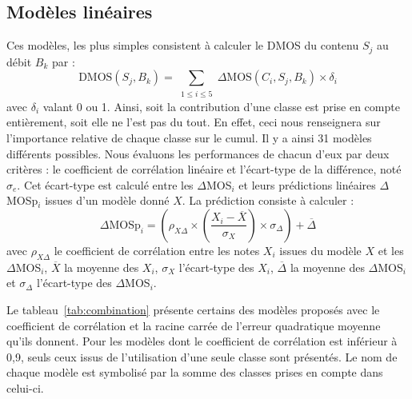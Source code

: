 \subsection{Modèles linéaires} \label{ssec:modeleLin}
Ces modèles, les plus simples consistent à calculer le DMOS du contenu $S_j$ au débit $B_k$ par :
\begin{equation}
\text{DMOS}(S_j,B_k) = \sum_{\substack{1\le i \le 5}}\Delta\text{MOS}(C_i, S_j, B_k) \times \delta_i
\end{equation}
%
avec $\delta_i$ valant 0 ou 1. Ainsi, soit la contribution d'une classe est prise en compte entièrement, soit elle ne l'est pas du tout. En effet, ceci nous renseignera sur l'importance relative de chaque classe sur le cumul. Il y a ainsi 31 modèles différents possibles. Nous évaluons les performances de chacun d'eux par deux critères : le coefficient de corrélation linéaire et l'écart-type de la différence, noté $\sigma_e$. Cet écart-type est calculé entre les $\Delta$MOS$_i$ et leurs prédictions linéaires $\Delta$MOSp$_i$ issues d'un modèle donné $X$. La prédiction consiste à calculer  :
\begin{equation}
\Delta\text{MOSp}_i = \left(\rho_{X\Delta} \times \left(\frac{X_i - \overline{X}}{\sigma_X}\right) \times \sigma_\Delta \right) + \overline{\Delta}
\end{equation}
%
avec $\rho_{X\Delta}$ le coefficient de corrélation entre les notes $X_i$ issues du modèle $X$ et les $\Delta$MOS$_i$, $\overline{X}$ la moyenne des $X_i$, $\sigma_X$ l'écart-type des $X_i$, $\overline{\Delta}$ la moyenne des $\Delta$MOS$_i$ et $\sigma_\Delta$ l'écart-type des $\Delta$MOS$_i$.

Le tableau~\ref{tab:combination} présente certains des modèles proposés avec le coefficient de corrélation et la racine carrée de l'erreur quadratique moyenne qu'ils donnent. Pour les modèles dont le coefficient de corrélation est inférieur à 0,9, seuls ceux issus de l'utilisation d'une seule classe sont présentés. Le nom de chaque modèle est symbolisé par la somme des classes prises en compte dans celui-ci.

